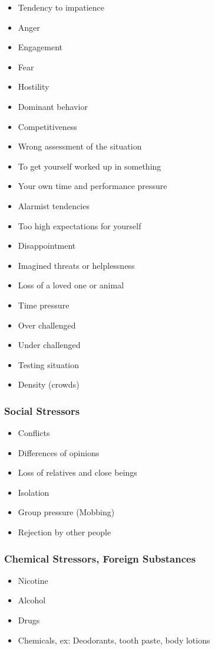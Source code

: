 \documentclass[../Book.Stress_regulation.tex]{subfiles}
\begin{document}
\begin{itemize}
\item Tendency to impatience
\item Anger
\item Engagement
\item Fear
\item Hostility
\item Dominant behavior
\item Competitiveness
\item Wrong assessment of the situation
\item To get yourself worked up in something
\item Your own time and performance pressure
\item Alarmist tendencies
\item Too high expectations for yourself
\item Disappointment
\item Imagined threats or helplessness
\item Loss of a loved one or animal 
\item Time pressure
\item Over challenged
\item Under challenged
\item Testing situation
\item Density (crowds)
\end{itemize}



\subsubsection{Social Stressors}

\begin{itemize}
\item Conflicts
\item Differences of opinions
\item Loss of relatives and close beings
\item Isolation
\item Group pressure (Mobbing)
\item Rejection by other people
\end{itemize}

\subsubsection{Chemical Stressors, Foreign Substances}
\begin{itemize}
\item Nicotine
\item Alcohol
\item Drugs
\item Chemicals, ex: Deodorants, tooth paste, body lotions
\end{itemize}
\end{document}
